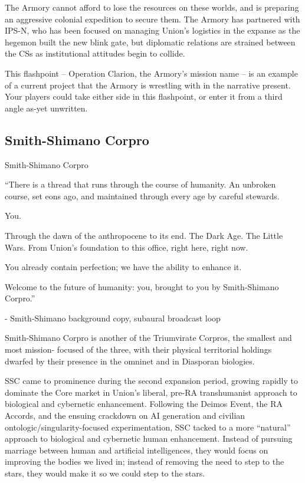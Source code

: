 The Armory cannot afford to lose the resources on these worlds, and is preparing an aggressive  
colonial expedition to secure them. The Armory has partnered with IPS-N, who has been focused  
on managing Union’s logistics in the expanse as the hegemon built the new blink gate, but  
diplomatic relations are strained between the CSs as institutional attitudes begin to collide.
 

This flashpoint -- Operation Clarion, the Armory’s mission name -- is an example of a current  
project that the Armory is wrestling with in the narrative present. Your players could take either  
side in this flashpoint, or enter it from a third angle as-yet unwritten. 
 
\subsection{Smith-Shimano Corpro}
Smith-Shimano Corpro  

         “There is a thread that runs through the course of humanity. An unbroken course,  
         set eons ago, and maintained through every age by careful stewards.   

         You.   

         Through the dawn of the anthropocene to its end. The Dark Age. The Little Wars.  
         From Union’s foundation to this office, right here, right now.   

         You already contain perfection; we have the ability to enhance it.   

         Welcome to the future of humanity: you, brought to you by Smith-Shimano Corpro.”    

             -   Smith-Shimano background copy, subaural broadcast loop  

                                                                                                            


Smith-Shimano Corpro is another of the Triumvirate Corpros, the smallest and most mission- 
focused of the three, with their physical territorial holdings dwarfed by their presence in the  
omninet and in Diasporan biologies. 
 

SSC came to prominence during the second expansion period, growing rapidly to dominate the  
Core market in Union’s liberal, pre-RA transhumanist approach to biological and cybernetic  
enhancement. Following the Deimos Event, the RA Accords, and the ensuing crackdown on AI  
generation and civilian ontologic/singularity-focused experimentation, SSC tacked to a more  
“natural” approach to biological and cybernetic human enhancement. Instead of pursuing  
marriage between human and artificial intelligences, they would focus on improving the bodies  
we lived in; instead of removing the need to step to the stars, they would make it so we could  
step to the stars. 
 

